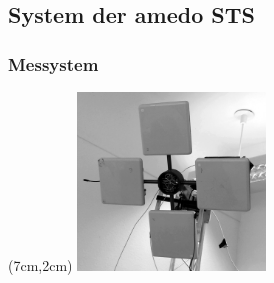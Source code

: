 \subsection{System der amedo STS}
\begin{frame}
  \frametitle{Messystem}
	\begin{textblock*}{5cm}(7cm,2cm) %
  		\includegraphics[width=5cm]{../img/4AntennaSetup_small.png}
  	\end{textblock*}
\end{frame}
